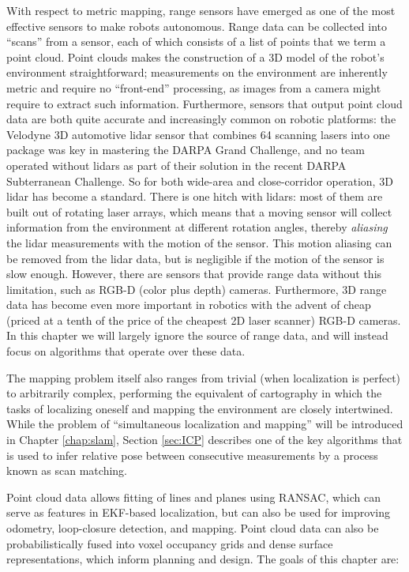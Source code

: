 With respect to metric mapping, range sensors have emerged as one of the most
effective sensors to make robots autonomous. Range data can be collected into
``scans'' from a sensor, each of which consists of a list of points that we
term a point cloud. Point clouds makes the construction of a 3D model of the
robot's environment straightforward; measurements on the environment are
inherently metric and require no ``front-end'' processing, as images from a
camera might require to extract such information. Furthermore, sensors that
output point cloud data are both quite accurate and increasingly common on
robotic platforms: the Velodyne 3D automotive lidar sensor that combines 64
scanning lasers into one package was key in mastering the DARPA Grand
Challenge, and no team operated without lidars as part of their solution in the
recent DARPA Subterranean Challenge. So for both wide-area and close-corridor
operation, 3D lidar has become a standard. There is one hitch with lidars: most
of them are built out of rotating laser arrays, which means that a moving
sensor will collect information from the environment at different rotation
angles, thereby \emph{aliasing} the lidar measurements with the motion of the
sensor. This motion aliasing can be removed from the lidar data, but is
negligible if the motion of the sensor is slow enough. However, there are
sensors that provide range data without this limitation, such as RGB-D (color
plus depth) cameras.  Furthermore, 3D range data has become even more important
in robotics with the advent of cheap (priced at a tenth of the price of the
cheapest 2D laser scanner) RGB-D cameras. In this chapter we will largely
ignore the source of range data, and will instead focus on algorithms that
operate over these data.

The mapping problem itself also ranges from trivial (when localization is
perfect) to arbitrarily complex, performing the equivalent of cartography in
which the tasks of localizing oneself and mapping the environment are closely
intertwined. While the problem of ``simultaneous localization and mapping''
will be introduced in Chapter \ref{chap:slam}, Section \ref{sec:ICP} describes
one of the key algorithms that is used to infer relative pose between
consecutive measurements by a process known as scan matching. 

Point cloud data allows fitting of lines and planes using RANSAC, which can
serve as features in EKF-based localization, but can also be used for improving
odometry, loop-closure detection, and mapping. Point cloud data can also be
probabilistically fused into voxel occupancy grids and dense surface
representations, which inform planning and design. The goals of this chapter
are:

